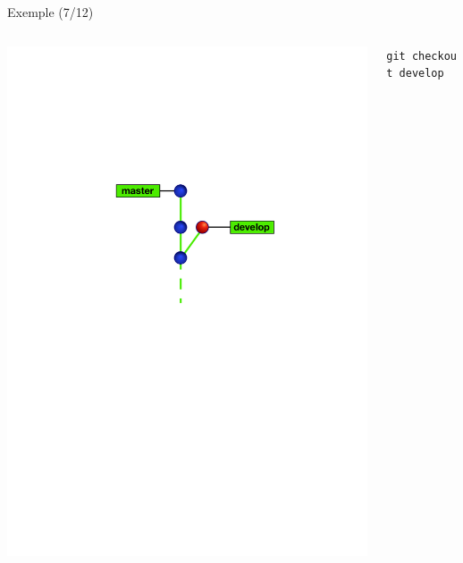 \begin{frame}[fragile]{%
\protect\hypertarget{exemple-712}{%
Exemple (7/12)}}

\begin{columns}[T]
\begin{column}{0.40\textwidth}
\includegraphics[width=1\textwidth]{images/branch7.pdf}
\end{column}

\begin{column}{0.60\textwidth}
\texttt{git\ checkout\ develop}
\end{column}
\end{columns}

\end{frame}

